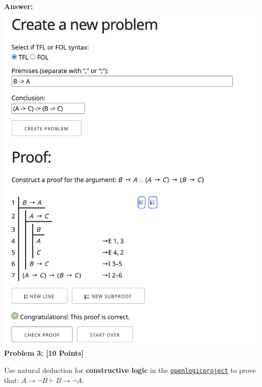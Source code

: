 \documentclass[12pt]{article}
\newcommand{\TURN}{\vdash}
\newcommand{\IMPLIES}{\rightarrow}
\newcommand{\Problem}[3]{\mbox{} \newline \noindent \textbf{\textbf{Problem #1: #2 [#3 Points] \\ }}}
\begin{document}
\bf{Answer:}
\includegraphics[scale = 0.4]{hw1pr2.png}
\Problem{3}{}{10}

Use natural deduction for \textbf{constructive logic}  in the \href{http://proofs.openlogicproject.org}{\texttt{openlogicproject}} to prove that:  $A \IMPLIES \neg B \TURN B \IMPLIES \neg A$.
\end{document}
